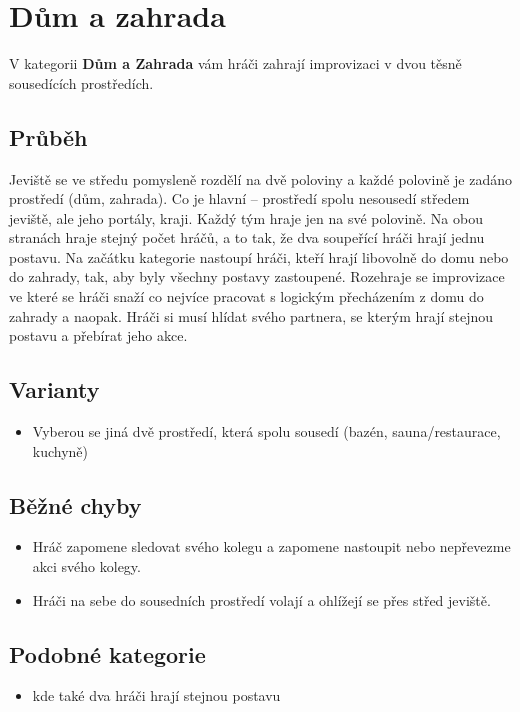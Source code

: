 \needspace{5cm} \section{Dům a zahrada} \label{dům a zahrada}  
 
 
V kategorii \textbf{Dům a Zahrada}{} vám hráči zahrají improvizaci v dvou těsně sousedících prostředích. 
 
 
\subsection{Průběh} Jeviště se ve středu pomysleně rozdělí na dvě poloviny a každé polovině je zadáno prostředí (dům, zahrada). Co je hlavní – prostředí spolu nesousedí středem jeviště, ale jeho portály, kraji. Každý tým hraje jen na své polovině. Na obou stranách hraje stejný počet hráčů, a to tak, že dva soupeřící hráči hrají jednu postavu. Na začátku kategorie nastoupí hráči, kteří hrají libovolně do domu nebo do zahrady, tak, aby byly všechny postavy zastoupené. Rozehraje se improvizace ve které se hráči snaží co nejvíce pracovat s logickým přecházením z domu do zahrady a naopak. Hráči si musí hlídat svého partnera, se kterým hrají stejnou postavu a přebírat jeho akce. 
 
\subsection{ Varianty } \begin{itemize}
\item Vyberou se jiná dvě prostředí, která spolu sousedí (bazén, sauna/restaurace, kuchyně)
\end{itemize}
 
\subsection{ Běžné chyby } \begin{itemize}
\item Hráč zapomene sledovat svého kolegu a zapomene nastoupit nebo nepřevezme akci svého kolegy.
\item Hráči na sebe do sousedních prostředí volají a ohlížejí se přes střed jeviště.
\end{itemize}
\subsection{Podobné kategorie} \begin{itemize}
\item {} kde také dva hráči hrají stejnou postavu
\end{itemize}
 
